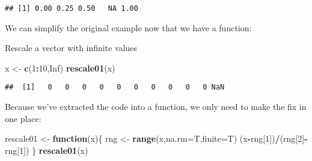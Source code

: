 \documentclass[
]{article}
\newenvironment{Shaded}{\begin{snugshade}}{\end{snugshade}}
\newcommand{\AttributeTok}[1]{\textcolor[rgb]{0.13,0.29,0.53}{#1}}
\newcommand{\ConstantTok}[1]{\textcolor[rgb]{0.56,0.35,0.01}{#1}}
\newcommand{\ControlFlowTok}[1]{\textcolor[rgb]{0.13,0.29,0.53}{\textbf{#1}}}
\newcommand{\DecValTok}[1]{\textcolor[rgb]{0.00,0.00,0.81}{#1}}
\newcommand{\FunctionTok}[1]{\textcolor[rgb]{0.13,0.29,0.53}{\textbf{#1}}}
\newcommand{\NormalTok}[1]{#1}
\newcommand{\OtherTok}[1]{\textcolor[rgb]{0.56,0.35,0.01}{#1}}
\newcommand{\SpecialCharTok}[1]{\textcolor[rgb]{0.81,0.36,0.00}{\textbf{#1}}}
\begin{document}
\begin{verbatim}
## [1] 0.00 0.25 0.50   NA 1.00
\end{verbatim}

We can simplify the original example now that we have a function:

\begin{Shaded}
\end{Shaded}

Rescale a vector with infinite values

\begin{Shaded}
\begin{Highlighting}[]
\NormalTok{x }\OtherTok{\textless{}{-}} \FunctionTok{c}\NormalTok{(}\DecValTok{1}\SpecialCharTok{:}\DecValTok{10}\NormalTok{,}\ConstantTok{Inf}\NormalTok{)}
\FunctionTok{rescale01}\NormalTok{(x)}
\end{Highlighting}
\end{Shaded}

\begin{verbatim}
##  [1]   0   0   0   0   0   0   0   0   0   0 NaN
\end{verbatim}

Because we've extracted the code into a function, we only need to make
the fix in one place:

\begin{Shaded}
\begin{Highlighting}[]
\NormalTok{rescale01 }\OtherTok{\textless{}{-}} \ControlFlowTok{function}\NormalTok{(x)\{}
\NormalTok{  rng }\OtherTok{\textless{}{-}} \FunctionTok{range}\NormalTok{(x,}\AttributeTok{na.rm=}\NormalTok{T,}\AttributeTok{finite=}\NormalTok{T)}
\NormalTok{  (x}\SpecialCharTok{{-}}\NormalTok{rng[}\DecValTok{1}\NormalTok{])}\SpecialCharTok{/}\NormalTok{(rng[}\DecValTok{2}\NormalTok{]}\SpecialCharTok{{-}}\NormalTok{rng[}\DecValTok{1}\NormalTok{])}
\NormalTok{\}}
\FunctionTok{rescale01}\NormalTok{(x)}
\end{Highlighting}
\end{Shaded}
\end{document}
